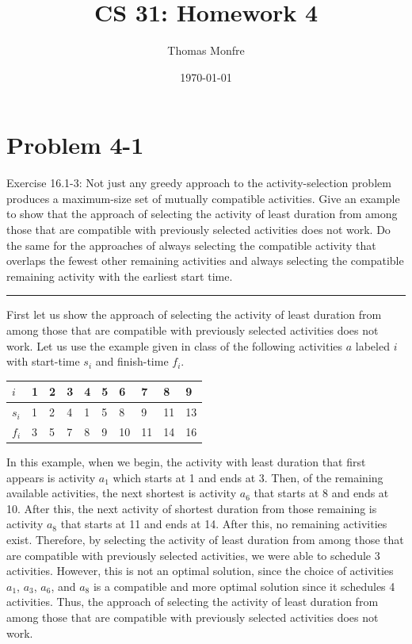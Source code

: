 \documentclass[11pt]{article}
\title{CS 31: Homework 4}
\author{Thomas Monfre}
\date{\today}
\def\separateline{\medskip\hrule\medskip}
\begin{document}
\maketitle

\section{Problem 4-1}
Exercise 16.1-3: Not just any greedy approach to the activity-selection problem produces a maximum-size set of mutually compatible activities. Give an example to show that the approach of selecting the activity of least duration from among those that are compatible with previously selected activities does not work. Do the same for the approaches of always selecting the compatible activity that overlaps the fewest other remaining activities and always selecting the compatible remaining activity with the earliest start time.
\separateline

First let us show the approach of selecting the activity of least duration from among those that are compatible with previously selected activities does not work. Let us use the example given in class of the following activities $a$ labeled $i$ with start-time $s_i$ and finish-time $f_i$.

\begin{table}[H]
\begin{tabular}{l|lllllllll}
$i$   & 1 & 2 & 3 & 4 & 5 & 6  & 7  & 8  & 9  \\ \hline
$s_i$ & 1 & 2 & 4 & 1 & 5 & 8  & 9  & 11 & 13 \\
$f_i$ & 3 & 5 & 7 & 8 & 9 & 10 & 11 & 14 & 16
\end{tabular}
\end{table}

In this example, when we begin, the activity with least duration that first appears is activity $a_1$ which starts at 1 and ends at 3. Then, of the remaining available activities, the next shortest is activity $a_6$ that starts at 8 and ends at 10. After this, the next activity of shortest duration from those remaining is activity $a_8$ that starts at 11 and ends at 14. After this, no remaining activities exist. Therefore, by selecting the activity of least duration from among those that are compatible with previously selected activities, we were able to schedule 3 activities. However, this is not an optimal solution, since the choice of activities $a_1$, $a_3$, $a_6$, and $a_8$ is a compatible and more optimal solution since it schedules 4 activities. Thus, the approach of selecting the activity of least duration from among those that are compatible with previously selected activities does not work.
\end{document}
